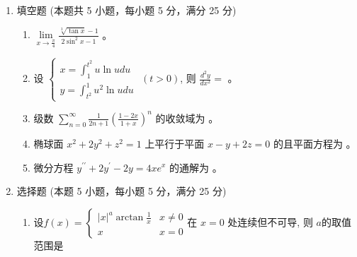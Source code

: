 

\begin{enumerate}
	\item
	填空题 (本题共 5 小题，每小题 5 分，满分 25 分)
\begin{enumerate}
	\item
	$\lim\limits _{x \rightarrow \frac{\pi}{4}} \frac{\sqrt[3]{\tan x}-1}{2 \sin ^{2} x-1}$  。
	\item 
	设 $\left\{\begin{aligned}x=\int_{1}^{t^{2}} u \ln u d u \\ y=\int_{t^{2}}^{1} u^{2} \ln u d u\end{aligned}\right.$ $(t>0)$, 则 $\frac{d^{2} y}{d x^{2}}=$  。
	\item 
	级数 $\sum\limits_{n=0}^{\infty} \frac{1}{2 n+1}\left(\frac{1-2 x}{1+x}\right)^{n}$ 的收敛域为 \tk{$ (0,2] $} 。
	\item 
椭球面 $x^{2}+2 y^{2}+z^{2}=1$ 上平行于平面 $x-y+2 z=0$ 的且平面方程为  。
	
	
	\item
	微分方程 $y^{\prime \prime}+2 y^{\prime}-2 y=4 x e^{x}$ 的通解为  。
	
	
\end{enumerate}

\item 	
选择题 (本题 5 小题，每小题 5 分，满分 25 分)	
\begin{enumerate}
	\item
	设$f(x)=\left\{\begin{array}{ll}|x|^{a} \arctan \frac{1}{x} & x \neq 0 \\ x & x=0\end{array}\right.$在 $x=0$ 处连续但不可导, 则 $a$的取值范围是  
	

\end{enumerate}
\end{enumerate}
